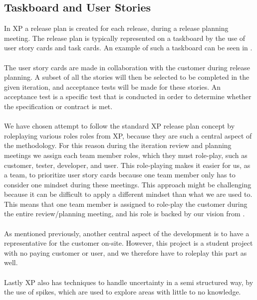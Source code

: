 \subsection{Taskboard and User Stories}
\label{sub:taskboard_and_user_stories}
In XP a release plan is created for each release, during a release planning meeting. The release plan is typically represented on a taskboard by the use of user story cards and task cards. An example of such a taskboard can be seen in \Figref{}. %
\\\\
The user story cards are made in collaboration with the customer during release planning.  A subset of all the stories will then be selected to be completed in the given iteration, and acceptance tests will be made for these stories. An acceptance test is a specific test that is conducted in order to determine whether the specification or contract is met.
\\\\
We have chosen attempt to follow the standard XP release plan concept by roleplaying various roles roles from XP, because they are such a central aspect of the methodology. For this reason during the iteration review and planning meetings we assign each team member roles, which they must role-play, such as customer, tester, developer, and user. This role-playing makes it easier for us, as a team, to prioritize user story cards because one team member only has to consider one mindset during these meetings. This approach might be challenging because it can be difficult to apply a different mindset than what we are used to. This means that one team member is assigned to role-play the customer during the entire review/planning meeting, and his role is backed by our vision from  .
\\\\
As mentioned previously, another central aspect of the development is to have a representative for the customer on-site. However, this project is a student project with no paying customer or user, and we therefore have to roleplay this part as well. 
\\\\
Lastly XP also has techniques to handle uncertainty in a semi structured way, by the use of spikes, which are used to explore areas with little to no knowledge. 

